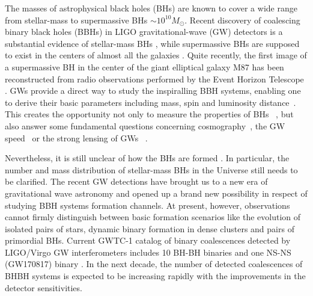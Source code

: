\documentclass[twocolumn]{aastex62}
\begin{document}
The masses of astrophysical black holes (BHs) are known to cover a wide range from stellar-mass to supermassive BHs $\sim10^{10} M_{\odot}$. Recent discovery of 
coalescing binary black holes (BBHs) in LIGO gravitational-wave (GW) detectors is a substantial evidence of stellar-mass BHs \citep{Abbott2016}, while supermassive BHs are supposed to exist in the centers of almost all the galaxies \citep{Lynden-Bell1969, Kormendy1995}. Quite recently, the first image of a supermassive BH in the center of the giant elliptical galaxy M87 has been reconstructed from radio observations performed by the Event Horizon Telescope \citep{Alberdi2019}. 
GWs provide a direct way to study the inspiralling BBH systems, enabling one to derive their basic parameters including mass, spin and luminosity distance~\citep{Abbott2017phy}. This creates the opportunity not only to measure the properties of BHs ~\citep{Abbott2018b}, but also answer some fundamental questions concerning cosmography~\citep{Liao2017, Ding2019, Cai2017}, the GW speed~\citep{Fan2017, Collett2017} or the strong lensing of GWs ~\citep{Ola2013, Biesiada2014, Ding2015}. 

Nevertheless, it is still unclear of how the BHs are formed \citep{Fryer1999, Fryer2001, Mirabel2016}. In particular, the number and mass distribution of stellar-mass BHs in the Universe still needs to be clarified.
The recent GW detections have brought us to a new era of gravitational wave astronomy \citep[e.g.,][]{Abbott2016, Abbott2016_sum, Abbott2018} and opened up a  brand new possibility in respect of studying BBH systems formation channels. 
At present, however, observations cannot firmly distinguish between basic formation scenarios like the evolution of isolated pairs of stars, dynamic binary
formation in dense clusters and pairs of primordial BHs.
Current GWTC-1 catalog of binary coalescences detected by LIGO/Virgo GW interferometers includes 10 BH-BH binaries and one NS-NS (GW170817) binary \citep{Abbott2018}. In the next decade, the number of detected coalescences of BHBH systems is expected to be increasing rapidly with the improvements in the detector sensitivities. 
\end{document}
